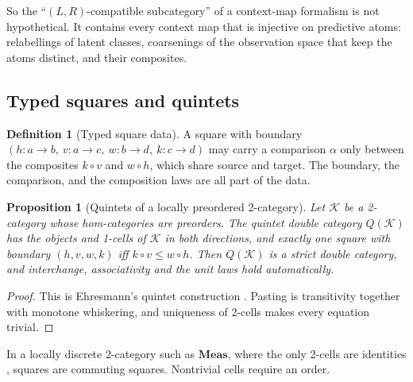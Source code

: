 \documentclass[11pt]{article}
\newtheorem{proposition}[theorem]{Proposition}
\theoremstyle{definition}
\newtheorem{definition}[theorem]{Definition}
\newcommand{\Meas}{\mathbf{Meas}}
\begin{document}
So the ``$(L,R)$-compatible subcategory'' of a context-map formalism is not hypothetical. It contains every context map that is injective
on predictive atoms: relabellings of latent classes, coarsenings of the observation space that keep the atoms distinct, and their
composites.

\subsection{Typed squares and quintets}
\begin{definition}[Typed square data]
A square with boundary $(h\colon a\to b,\ v\colon a\to c,\ w\colon b\to d,\ k\colon c\to d)$ may carry a comparison $\alpha$ only between
the composites $k\circ v$ and $w\circ h$, which share source and target. The boundary, the comparison, and the composition laws are all
part of the data.
\end{definition}

\begin{proposition}[Quintets of a locally preordered 2-category]\label{prop:quintets}
Let $\mathcal K$ be a 2-category whose hom-categories are preorders. The quintet double category $Q(\mathcal K)$ has the objects and
1-cells of $\mathcal K$ in both directions, and exactly one square with boundary $(h,v,w,k)$ iff $k\circ v\le w\circ h$. Then
$Q(\mathcal K)$ is a strict double category, and interchange, associativity and the unit laws hold automatically.
\end{proposition}
\begin{proof}
This is Ehresmann's quintet construction \cite{Ehresmann1963,Grandis2019}. Pasting is transitivity together with monotone whiskering,
and uniqueness of 2-cells makes every equation trivial.
\end{proof}

In a locally discrete 2-category such as $\Meas$, where the only 2-cells are identities \cite[\S\S13.1, 13.5]{Tower}, squares are
commuting squares. Nontrivial cells require an order.
\end{document}
